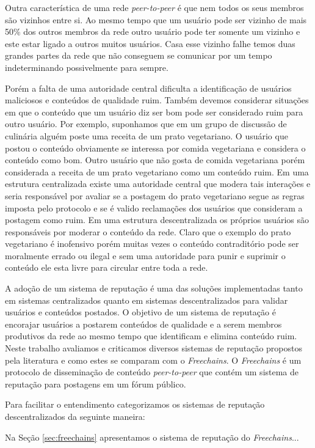 \documentclass[12pt]{article}
\newcommand{\FC} {\textit{Freechains}\xspace}
\newcommand{\PtoP} {\textit{peer-to-peer}\xspace}
\begin{document}
Outra característica de uma rede \PtoP é que nem todos os seus membros são vizinhos entre si.
Ao mesmo tempo que um usuário pode ser vizinho de mais 50\% dos outros membros da rede outro usuário pode ter somente um vizinho e este estar ligado a outros muitos usuários.
Casa esse vizinho falhe temos duas grandes partes da rede que não conseguem se comunicar por um tempo indeterminando possivelmente para sempre.

Porém a falta de uma autoridade central dificulta a identificação de usuários maliciosos e conteúdos de qualidade ruim. 
Também devemos considerar situações em que o conteúdo que um usuário diz ser bom pode ser considerado ruim para outro usuário.
Por exemplo, suponhamos que em um grupo de discussão de culinária alguém poste uma receita de um prato vegetariano.
O usuário que postou o conteúdo obviamente se interessa por comida vegetariana e considera o conteúdo como bom.
Outro usuário que não gosta de comida vegetariana porém considerada a receita de um prato vegetariano como um conteúdo ruim.
Em uma estrutura centralizada existe uma autoridade central que modera tais interações e seria responsável por avaliar se a postagem do prato vegetariano segue as regras imposta pelo protocolo e se é valido reclamações dos usuários que consideram a postagem como ruim.
Em uma estrutura descentralizada os próprios usuários são responsáveis por moderar o conteúdo da rede.
Claro que o exemplo do prato vegetariano é inofensivo porém muitas vezes o conteúdo contraditório pode ser moralmente errado ou ilegal e sem uma autoridade para punir e suprimir o conteúdo ele esta livre para circular entre toda a rede.

A adoção de um sistema de reputação é uma das soluções implementadas tanto em sistemas centralizados quanto em sistemas descentralizados para validar usuários e conteúdos postados.
O objetivo de um sistema de reputação é encorajar usuários a postarem conteúdos de qualidade e a serem membros produtivos da rede ao mesmo tempo que identificam e elimina conteúdo ruim.
Neste trabalho avaliamos e criticamos diversos sistemas de reputação propostos pela literatura e como estes se comparam com o \FC.
O \FC é um protocolo de disseminação de conteúdo \PtoP que contém um sistema de reputação para postagens em um fórum público.

Para facilitar o entendimento categorizamos os sistemas de reputação descentralizados da seguinte maneira:

Na Seção \ref{sec:freechains} apresentamos o sistema de reputação do \FC...
\end{document}
